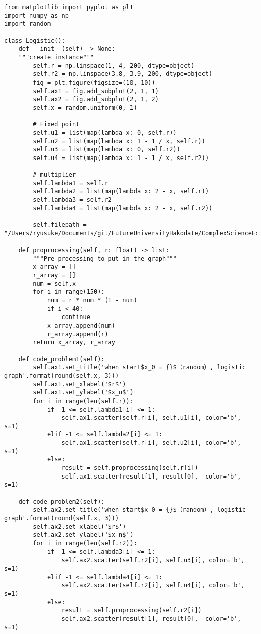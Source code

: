 \documentclass[a4j]{jsarticle}
\begin{document}
\begin{lstlisting}[caption=Pythonによる課題１と課題２の描画]
from matplotlib import pyplot as plt
import numpy as np
import random

class Logistic():
    def __init__(self) -> None:
    """create instance"""
        self.r = np.linspace(1, 4, 200, dtype=object)
        self.r2 = np.linspace(3.8, 3.9, 200, dtype=object)
        fig = plt.figure(figsize=(10, 10))
        self.ax1 = fig.add_subplot(2, 1, 1)
        self.ax2 = fig.add_subplot(2, 1, 2)
        self.x = random.uniform(0, 1)

        # Fixed point
        self.u1 = list(map(lambda x: 0, self.r))
        self.u2 = list(map(lambda x: 1 - 1 / x, self.r))
        self.u3 = list(map(lambda x: 0, self.r2))
        self.u4 = list(map(lambda x: 1 - 1 / x, self.r2))

        # multiplier
        self.lambda1 = self.r
        self.lambda2 = list(map(lambda x: 2 - x, self.r))
        self.lambda3 = self.r2
        self.lambda4 = list(map(lambda x: 2 - x, self.r2))

        self.filepath = "/Users/ryusuke/Documents/git/FutureUniversityHakodate/ComplexScienceExercise/result/"

    def proprocessing(self, r: float) -> list:
        """Pre-processing to put in the graph"""
        x_array = []
        r_array = []
        num = self.x
        for i in range(150):
            num = r * num * (1 - num)
            if i < 40:
                continue
            x_array.append(num)
            r_array.append(r)
        return x_array, r_array

    def code_problem1(self):
        self.ax1.set_title('when start$x_0 = {}$（random）, logistic graph'.format(round(self.x, 3)))
        self.ax1.set_xlabel('$r$')
        self.ax1.set_ylabel('$x_n$')
        for i in range(len(self.r)):
            if -1 <= self.lambda1[i] <= 1:
                self.ax1.scatter(self.r[i], self.u1[i], color='b', s=1)
            elif -1 <= self.lambda2[i] <= 1:
                self.ax1.scatter(self.r[i], self.u2[i], color='b', s=1)
            else:
                result = self.proprocessing(self.r[i])
                self.ax1.scatter(result[1], result[0],  color='b', s=1)

    def code_problem2(self):
        self.ax2.set_title('when start$x_0 = {}$（random）, logistic graph'.format(round(self.x, 3)))
        self.ax2.set_xlabel('$r$')
        self.ax2.set_ylabel('$x_n$')
        for i in range(len(self.r2)):
            if -1 <= self.lambda3[i] <= 1:
                self.ax2.scatter(self.r2[i], self.u3[i], color='b', s=1)
            elif -1 <= self.lambda4[i] <= 1:
                self.ax2.scatter(self.r2[i], self.u4[i], color='b', s=1)
            else:
                result = self.proprocessing(self.r2[i])
                self.ax2.scatter(result[1], result[0],  color='b', s=1)


\end{lstlisting}
\end{document}
